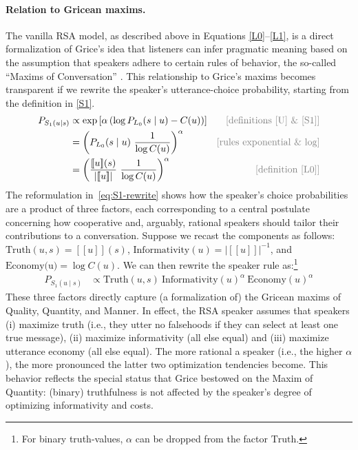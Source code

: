 \documentclass{sp}
\newcommand{\sem}[1]{\ensuremath{[\![#1]\!]}}
\begin{document}
\paragraph{Relation to Gricean maxims.} The vanilla RSA model, as described above in Equations
\eqref{L0}--\eqref{L1}, is a direct formalization of Grice's idea that listeners can infer
pragmatic meaning based on the assumption that speakers adhere to certain rules of behavior,
the so-called ``Maxims of Conversation'' \citep{Grice1975:Logic-and-Conve}. This relationship to Grice's maxims becomes
transparent if we rewrite the speaker's utterance-choice probability, starting from the
definition in \eqref{S1}.
%
\begin{align} \label{eq:S1-rewrite}
  P_{S_1(u\mid s)} & \propto \exp \left [ \alpha \left (\log P_{L_0}(s \mid u) - C(u) \right)  \right ] & \text{\textcolor{gray}{[definitions \eqref{U} \& \eqref{S1}]}} \\
  & = \left (P_{L_0}(s \mid u) \  \frac{1}{\log C(u)} \right)^{\alpha} & \text{\textcolor{gray}{[rules exponential \& log]}} \nonumber \\
  & = \left ( \frac{\sem{u}(s)}{| \sem{u} |} \ \frac{1}{\log C(u)} \right )^{\alpha} & \text{\textcolor{gray}{[definition \eqref{L0}]}} \nonumber 
\end{align}
%
The reformulation in~\eqref{eq:S1-rewrite} shows how the speaker's choice probabilities are a
product of three factors, each corresponding to a central postulate concerning how cooperative and, arguably, rational speakers should tailor their contributions
to a conversation. Suppose we recast the components as follows:
$\text{Truth}(u,s) = \sem{u}(s)$, $\text{Informativity}(u) = |\sem{u}|^{-1}$, and
$\text{Economy(u)} = \log C(u)$. We can then rewrite the speaker rule as:\footnote{For
binary truth-values, $\alpha$ can be dropped from the factor $\text{Truth}$.}
\begin{align} \label{eq:S1-three-factor-formulation}
  P_{S_1(u\mid s)}   & \propto \text{Truth}(u,s) \ \text{Informativity}(u)^{\alpha} \ \text{Economy}(u)^{\alpha} %
\end{align}
These three factors directly capture (a formalization of) the Gricean maxims of Quality,
Quantity, and Manner. In effect, the RSA speaker assumes that speakers (i) maximize truth
(i.e., they utter no falsehoods if they can select at least one
true message), (ii) maximize informativity (all else equal) and (iii) maximize utterance
economy (all else equal). The more rational a speaker (i.e., the higher $\alpha$), the more
pronounced the latter two optimization tendencies become. This behavior reflects the special
status that Grice bestowed on the Maxim of Quantity: (binary) truthfulness is not affected by
the speaker's degree of optimizing informativity and costs.
\end{document}
